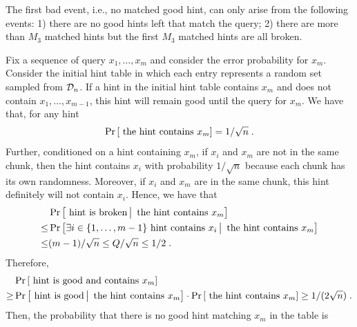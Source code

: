     The first bad event, i.e., no matched good hint, 
can only arise from the following events: 
1) there are no good hints left that match the query; 
2) there are more than $M_3$ matched hints 
but the first $M_3$ matched hints are all broken. 
    
    Fix a sequence of query $x_1,\dots,x_m$ and consider the 
error probability for $x_m$. 
    Consider the initial hint table
in which each entry represents a random set sampled from $\mathcal{D}_n$. 
    If a hint in the initial hint table contains $x_m$ and does not contain $x_1,\dots,x_{m-1}$, this hint will remain good until the query for $x_m$. We have that, for any hint
    \begin{displaymath}
        \Pr\left[\text{ the hint contains }x_m \right]=1/\sqrt{n}\;.
    \end{displaymath}
Further, conditioned on a hint containing $x_m$, if $x_i$ and $x_m$ are not in the same chunk, then the hint contains $x_i$ with probability $1/\sqrt{n}$ because each chunk has its own randomness.
Moreover, if $x_i$ and $x_m$ are in the same chunk, this hint definitely will not contain $x_i$.
    Hence, we have that 
    \begin{align*}
        &\Pr\left[\text{ hint is broken} \,\big|\, \text{ the hint contains }x_m \right]\\
        \leq& \Pr\left[\exists i\in \{1,\ldots,m-1\}\text{ hint contains }x_i \,\big|\, \text{ the hint contains }x_m \right]\\
\leq & (m-1)/\sqrt{n}\leq Q/\sqrt{n}\leq 1/2\;.
    \end{align*}
    Therefore, 
    \begin{align*}
        &\Pr\left[\text{ hint is good and contains }x_m \right]\\
        \geq &\Pr\left[\text{ hint is good} \,\big|\, \text{ the hint contains }x_m \right]\cdot \Pr\left[\text{ the hint contains }x_m \right] \geq 1/(2\sqrt{n})\;.
    \end{align*}
    Then, the probability that 
there is no good hint matching $x_m$ in the table is 
